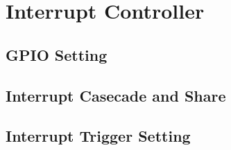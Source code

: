 \section{Interrupt Controller}
\subsection{GPIO Setting}
\subsection{Interrupt Casecade and Share}
\subsection{Interrupt Trigger Setting}

